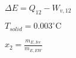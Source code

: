 \( \Delta E = Q_{12} - W_{v,12} \)  

\( T_{solid} = 0.003^\circ \text{C} \)  

\( x_2 = \frac{m_{E,Ice}}{m_{E,EW}} \)